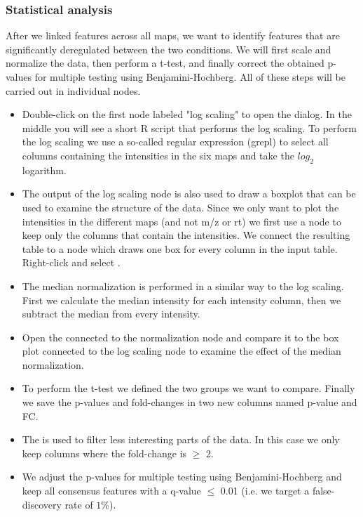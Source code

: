\subsubsection{Statistical analysis}
After we linked features across all maps, we want to identify features that are significantly deregulated between the two conditions. We will first scale and normalize the data, then perform a t-test, and finally correct the obtained p-values for multiple testing using Benjamini-Hochberg. All of these steps will be carried out in individual  nodes.
\begin{itemize}
\item Double-click on the first  node labeled "log scaling" to open the  dialog. In the middle you will see a short R script that performs the log scaling. To perform the log scaling we use a so-called regular expression (grepl) to select all columns containing the intensities in the six maps and take the $log_2$ logarithm.

\item The output of the log scaling node is also used to draw a boxplot that can be used to examine the structure of the data. Since we only want to plot the intensities in the different maps (and not m/z or rt) we first use a  node to keep only the columns that contain the intensities. We connect the resulting table to a  node which draws one box for every column in the input table. Right-click and select .

\item The median normalization is performed in a similar way to the log scaling. First we calculate the median intensity for each intensity column, then we subtract the median from every intensity.

\item Open the  connected to the normalization node and compare it to the box plot connected to the log scaling node to examine the effect of the median normalization.

\item To perform the t-test we defined the two groups we want to compare. Finally we save the p-values and fold-changes in two new columns named p-value and FC.

\item The  is used to filter less interesting parts of the data. In this case we only keep columns where the fold-change is $\geq$ 2.

\item We adjust the p-values for multiple testing using Benjamini-Hochberg and keep all consensus features with a q-value $\leq$ 0.01 (i.e. we target a false-discovery rate of $1\%$).

\end{itemize}


